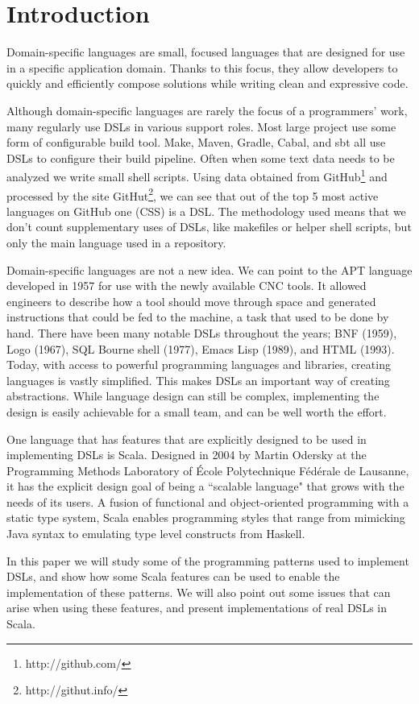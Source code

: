 \chapter{Introduction}

Domain-specific languages are small, focused languages that are designed for use in a specific application domain.
Thanks to this focus, they allow developers to quickly and efficiently compose solutions while writing clean and expressive code.

Although domain-specific languages are rarely the focus of a programmers' work, many regularly use DSLs in various support roles.
Most large project use some form of configurable build tool.
Make, Maven, Gradle, Cabal, and sbt all use DSLs to configure their build pipeline.
Often when some text data needs to be analyzed we write small shell scripts.
Using data obtained from GitHub\footnote{http://github.com/} and processed by the site GitHut\footnote{http://githut.info/}, we can see that out of the top 5 most active languages on GitHub one (CSS) is a DSL.
The methodology used means that we don't count supplementary uses of DSLs, like makefiles or helper shell scripts, but only the main language used in a repository.

Domain-specific languages are not a new idea.
We can point to the APT language developed in 1957 \cite{Ross:1978} for use with the newly available CNC tools.
It allowed engineers to describe how a tool should move through space and generated instructions that could be fed to the machine, a task that used to be done by hand.
There have been many notable DSLs throughout the years; BNF (1959), Logo (1967), SQL Bourne shell (1977), Emacs Lisp (1989), and HTML (1993).
Today, with access to powerful programming languages and libraries, creating languages is vastly simplified.
This makes DSLs an important way of creating abstractions.
While language design can still be complex, implementing the design is easily achievable for a small team, and can be well worth the effort.

One language that has features that are explicitly designed to be used in implementing DSLs is Scala.
Designed in 2004 by Martin Odersky at the Programming Methods Laboratory of \'Ecole Polytechnique F\'ed\'erale de Lausanne, it has the explicit design goal of being a ``scalable language" that grows with the needs of its users.
A fusion of functional and object-oriented programming with a static type system, Scala enables programming styles that range from mimicking Java syntax to emulating type level constructs from Haskell.

In this paper we will study some of the programming patterns used to implement DSLs, and show how some Scala features can be used to enable the implementation of these patterns.
We will also point out some issues that can arise when using these features, and present implementations of real DSLs in Scala.